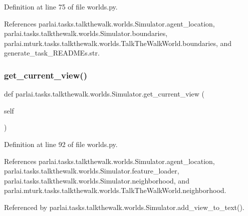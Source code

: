 Definition at line 75 of file worlds.\+py.



References parlai.\+tasks.\+talkthewalk.\+worlds.\+Simulator.\+agent\+\_\+location, parlai.\+tasks.\+talkthewalk.\+worlds.\+Simulator.\+boundaries, parlai.\+mturk.\+tasks.\+talkthewalk.\+worlds.\+Talk\+The\+Walk\+World.\+boundaries, and generate\+\_\+task\+\_\+\+R\+E\+A\+D\+M\+Es.\+str.

\mbox{\label{classparlai_1_1tasks_1_1talkthewalk_1_1worlds_1_1Simulator_a5178f95389423f1ee1ad5440e60ad976}} 
\subsubsection{\texorpdfstring{get\+\_\+current\+\_\+view()}{get\_current\_view()}}
{\footnotesize\ttfamily def parlai.\+tasks.\+talkthewalk.\+worlds.\+Simulator.\+get\+\_\+current\+\_\+view (\begin{DoxyParamCaption}\item[{}]{self }\end{DoxyParamCaption})}



Definition at line 92 of file worlds.\+py.



References parlai.\+tasks.\+talkthewalk.\+worlds.\+Simulator.\+agent\+\_\+location, parlai.\+tasks.\+talkthewalk.\+worlds.\+Simulator.\+feature\+\_\+loader, parlai.\+tasks.\+talkthewalk.\+worlds.\+Simulator.\+neighborhood, and parlai.\+mturk.\+tasks.\+talkthewalk.\+worlds.\+Talk\+The\+Walk\+World.\+neighborhood.



Referenced by parlai.\+tasks.\+talkthewalk.\+worlds.\+Simulator.\+add\+\_\+view\+\_\+to\+\_\+text().

